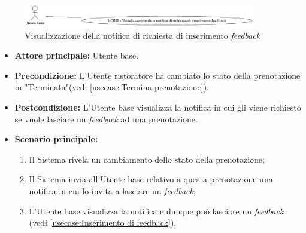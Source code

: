 \label{usecase:Visualizzazione della notifica di richiesta di inserimento feedback}

\begin{figure}[h]
	\centering
	\includegraphics[width=0.9\textwidth]{./uml/UCB18.png} 
	\caption{Visualizzazione della notifica di richiesta di inserimento \textit{feedback}}
	\label{fig:UCB17}
  \end{figure}

\begin{itemize}
	\item \textbf{Attore principale:} Utente base.


	\item \textbf{Precondizione:} L'Utente ristoratore ha cambiato lo stato della prenotazione in "Terminata"(vedi \autoref{usecase:Termina prenotazione}).


	\item \textbf{Postcondizione:} L'Utente base visualizza la notifica in cui
	      gli viene richiesto se vuole lasciare un \textit{feedback} ad una prenotazione.

	\item \textbf{Scenario principale:}
	      \begin{enumerate}
		      \item Il Sistema rivela un cambiamento dello stato della prenotazione;
		      \item Il Sistema invia all'Utente base relativo a questa prenotazione una notifica in cui lo invita a lasciare un \textit{feedback};
		      \item L'Utente base visualizza la notifica e dunque può lasciare un \textit{feedback} (vedi \autoref{usecase:Inserimento di feedback}).
	      \end{enumerate}
\end{itemize}
